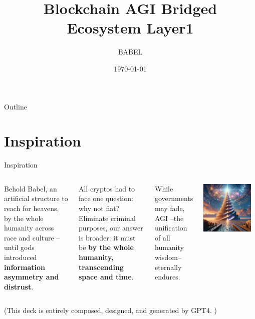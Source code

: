\documentclass{beamer}
\title{B{\tiny lockchain} A{\tiny GI} B{\tiny ridged} E{\tiny cosystem} L{\tiny ayer1}}
\author{BABEL}
\institute{PIVOT DAO}
\date{\today}
\begin{document}
\begin{frame}
\titlepage
\end{frame}

\begin{frame}{Outline}
\tableofcontents
\end{frame}

\section{Inspiration}
\begin{frame}{Inspiration}

\begin{columns}
Behold Babel, an artificial structure to reach for heavens, by the whole humanity across race and culture -- until gods introduced \textbf{information asymmetry and distrust}. 

All cryptos had to face one question: why not fiat? Eliminate criminal purposes, our answer is broader: it must be \textbf{by the whole humanity, transcending space and time}. 

While governments may fade, AGI --the unification of all humanity wisdom-- eternally endures.
\begin{center}
\includegraphics[width=0.9\textwidth]{images/babel.png}
\end{center}
\end{columns}


\begin{center}
(This deck is entirely composed, designed, and generated by GPT4. )
\end{center}
\end{frame}
\end{document}
